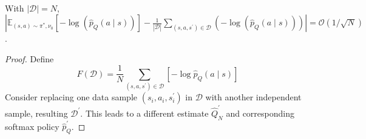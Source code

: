 \begin{lem} 
\;
\\
With $|\mathcal{D}|=N$,
    $|\mathbb{E}_{(s, a) \sim \pi^*, \nu_0}\left[-\log \left(\hat{p}_Q(a \mid s)\right)\right]-\frac{1}{|\mathcal{D}|}\sum_{(s,a,s^\prime)\in \mathcal{D}} (-\log(\hat{p}_Q(a \mid s)))| = \mathcal{O}(1/\sqrt{N})$.
\end{lem}
\begin{proof}
Define 
$$
F(\mathcal{D})=\frac{1}{N} \sum_{\left(s, a, s^{\prime}\right) \in \mathcal{D}}\left[-\log \hat{p}_Q(a \mid s)\right]
$$
Consider replacing one data sample $\left(s_i, a_i, s_i^{\prime}\right)$ in $\mathcal{D}$ with another independent sample, resulting $\mathcal{D}^\prime$. This leads to a different estimate $\hat{Q}_N^{\prime}$ and corresponding softmax policy $\hat{p}_Q^{\prime}$. 
\end{proof}


